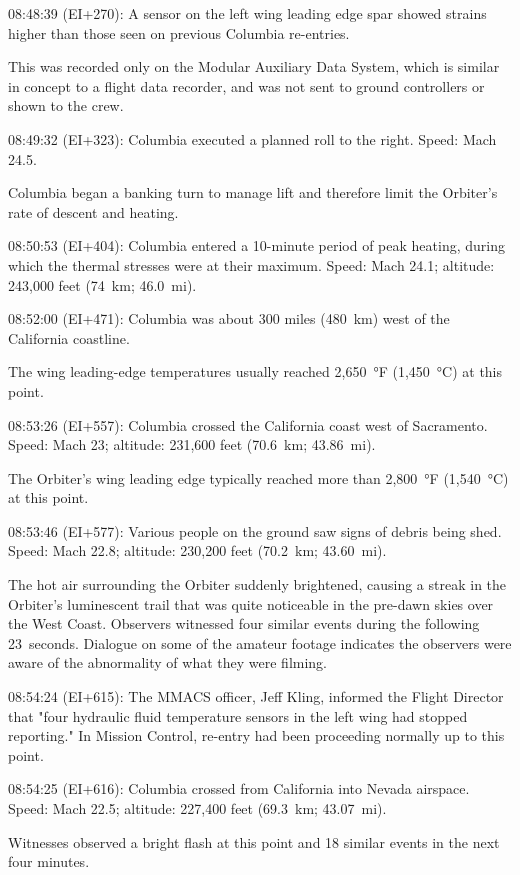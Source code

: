 08:48:39 (EI+270): A sensor on the left wing leading edge spar showed
strains higher than those seen on previous Columbia re-entries.

This was recorded only on the Modular Auxiliary Data System, which is
similar in concept to a flight data recorder, and was not sent to ground
controllers or shown to the crew.

08:49:32 (EI+323): Columbia executed a planned roll to the right. Speed:
Mach 24.5.

Columbia began a banking turn to manage lift and therefore limit the
Orbiter's rate of descent and heating.

08:50:53 (EI+404): Columbia entered a 10-minute period of peak heating,
during which the thermal stresses were at their maximum. Speed: Mach
24.1; altitude: 243,000 feet (74~km; 46.0~mi).

08:52:00 (EI+471): Columbia was about 300 miles (480~km) west of the
California coastline.

The wing leading-edge temperatures usually reached 2,650~°F (1,450~°C)
at this point.

08:53:26 (EI+557): Columbia crossed the California coast west of
Sacramento. Speed: Mach 23; altitude: 231,600 feet (70.6~km; 43.86~mi).

The Orbiter's wing leading edge typically reached more than 2,800~°F
(1,540~°C) at this point.

08:53:46 (EI+577): Various people on the ground saw signs of debris
being shed. Speed: Mach 22.8; altitude: 230,200 feet (70.2~km;
43.60~mi).

The hot air surrounding the Orbiter suddenly brightened, causing a
streak in the Orbiter's luminescent trail that was quite noticeable in
the pre-dawn skies over the West Coast. Observers witnessed four similar
events during the following 23~seconds. Dialogue on some of the amateur
footage indicates the observers were aware of the abnormality of what
they were filming.

08:54:24 (EI+615): The MMACS officer, Jeff Kling, informed the Flight
Director that "four hydraulic fluid temperature sensors in the left wing
had stopped reporting." In Mission Control, re-entry had been proceeding
normally up to this point.

08:54:25 (EI+616): Columbia crossed from California into Nevada
airspace. Speed: Mach 22.5; altitude: 227,400 feet (69.3~km; 43.07~mi).

Witnesses observed a bright flash at this point and 18 similar events in
the next four minutes.


